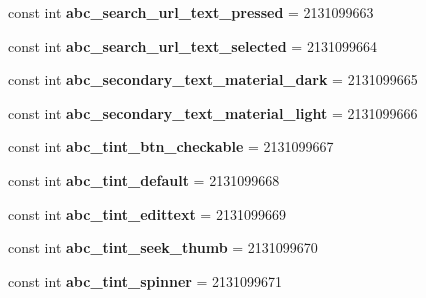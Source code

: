 \begin{DoxyCompactItemize}
const int {\bfseries abc\+\_\+search\+\_\+url\+\_\+text\+\_\+pressed} = 2131099663
\item 
\mbox{\label{classst_delivery_1_1_resource_1_1_color_a8a30e5d6926456d1ce2d773c499b4daf}} 
const int {\bfseries abc\+\_\+search\+\_\+url\+\_\+text\+\_\+selected} = 2131099664
\item 
\mbox{\label{classst_delivery_1_1_resource_1_1_color_a448fb05935f30533324f29eb2583b4ae}} 
const int {\bfseries abc\+\_\+secondary\+\_\+text\+\_\+material\+\_\+dark} = 2131099665
\item 
\mbox{\label{classst_delivery_1_1_resource_1_1_color_a0627a321c5bfd981b20be041afa718ec}} 
const int {\bfseries abc\+\_\+secondary\+\_\+text\+\_\+material\+\_\+light} = 2131099666
\item 
\mbox{\label{classst_delivery_1_1_resource_1_1_color_a1d378e29e0a0dc82e984e63367873b70}} 
const int {\bfseries abc\+\_\+tint\+\_\+btn\+\_\+checkable} = 2131099667
\item 
\mbox{\label{classst_delivery_1_1_resource_1_1_color_ad4b8cb20b3dae8e8e0ef9a0683dd8f2a}} 
const int {\bfseries abc\+\_\+tint\+\_\+default} = 2131099668
\item 
\mbox{\label{classst_delivery_1_1_resource_1_1_color_afcf7b76a0de79fd15806a3454eb5b5ee}} 
const int {\bfseries abc\+\_\+tint\+\_\+edittext} = 2131099669
\item 
\mbox{\label{classst_delivery_1_1_resource_1_1_color_a9ab6c799593d2a657997c3e02080e840}} 
const int {\bfseries abc\+\_\+tint\+\_\+seek\+\_\+thumb} = 2131099670
\item 
\mbox{\label{classst_delivery_1_1_resource_1_1_color_a0bef5e3fbc27d028a17501d38b1b5371}} 
const int {\bfseries abc\+\_\+tint\+\_\+spinner} = 2131099671
\item 
\mbox{\label{classst_delivery_1_1_resource_1_1_color_a0b451b8022facf4f3f372273cb79b842}} 

\end{DoxyCompactItemize}
